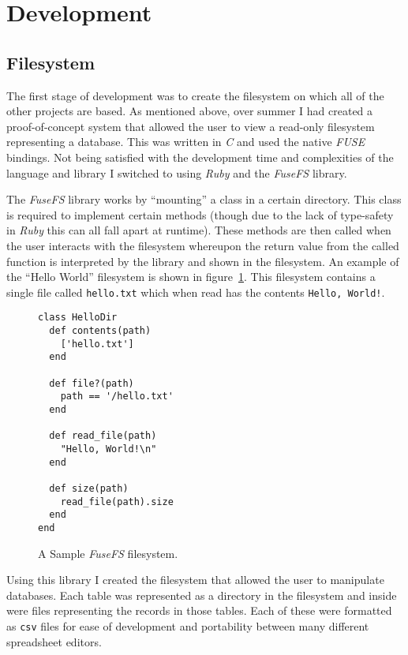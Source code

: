 \section{Development}

\subsection{Filesystem}

The first stage of development was to create the filesystem on which all of the
other projects are based. As mentioned above, over summer I had created
a proof-of-concept system that allowed the user to view a read-only filesystem
representing a database. This was written in \emph{C} and used the native
\emph{FUSE} bindings. Not being satisfied with the development time and
complexities of the language and library I switched to using \emph{Ruby} and
the \emph{FuseFS} library.

The \emph{FuseFS} library works by ``mounting'' a class in a certain directory.
This class is required to implement certain methods (though due to the lack of
type-safety in \emph{Ruby} this can all fall apart at runtime). These methods
are then called when the user interacts with the filesystem whereupon the
return value from the called function is interpreted by the library and shown
in the filesystem. An example of the ``Hello World'' filesystem is shown in
figure~\ref{fig:fusefs}. This filesystem contains a single file called
\texttt{hello.txt} which when read has the contents \texttt{Hello, World!}.

\begin{figure}
\begin{verbatim}
class HelloDir
  def contents(path)
    ['hello.txt']
  end

  def file?(path)
    path == '/hello.txt'
  end

  def read_file(path)
    "Hello, World!\n"
  end

  def size(path)
    read_file(path).size
  end
end
\end{verbatim}
  \caption{A Sample \emph{FuseFS} filesystem.}
  \label{fig:fusefs}
\end{figure}

Using this library I created the filesystem that allowed the user to manipulate
databases. Each table was represented as a directory in the filesystem and
inside were files representing the records in those tables. Each of these were
formatted as \texttt{csv} files for ease of development and portability between
many different spreadsheet editors.

